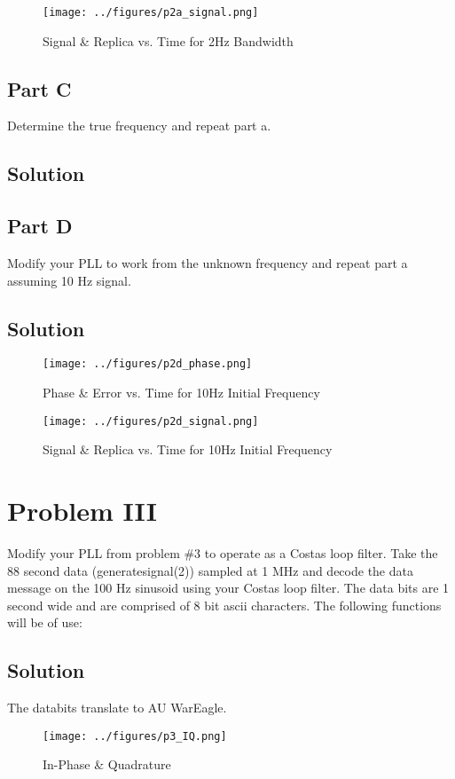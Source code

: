 \documentclass{article}
\begin{document}
\begin{figure}[H]
    \centering
    \texttt{[image: ../figures/p2a\_signal.png]}\label{fig:p2b_signal}
    \caption{Signal \& Replica vs. Time for 2Hz Bandwidth}
\end{figure}

\subsection*{Part C}
Determine the true frequency and repeat part a.
\subsection*{Solution}

\subsection*{Part D}
Modify your PLL to work from the unknown frequency and repeat part a assuming 10
Hz signal.
\subsection*{Solution}
\begin{figure}[H]
    \centering
    \texttt{[image: ../figures/p2d\_phase.png]}\label{fig:p2d_phase}
    \caption{Phase \& Error vs. Time for 10Hz Initial Frequency}
\end{figure}

\begin{figure}[H]
    \centering
    \texttt{[image: ../figures/p2d\_signal.png]}\label{fig:p2d_signal}
    \caption{Signal \& Replica vs. Time for 10Hz Initial Frequency}
\end{figure}

\section*{Problem III}
Modify your PLL from problem \#3 to operate as a Costas loop filter. Take the 88 second
data (generate\textunderscore signal(2)) sampled at 1 MHz and decode the data message on the 100 Hz
sinusoid using your Costas loop filter. The data bits are 1 second wide and are comprised
of 8 bit ascii characters. The following functions will be of use:
\subsection*{Solution}
The databits translate to AU WarEagle.
\begin{figure}[H]
    \centering
    \texttt{[image: ../figures/p3\_IQ.png]}\label{fig:p3_IQ}
    \caption{In-Phase \& Quadrature}
\end{figure}
\end{document}
